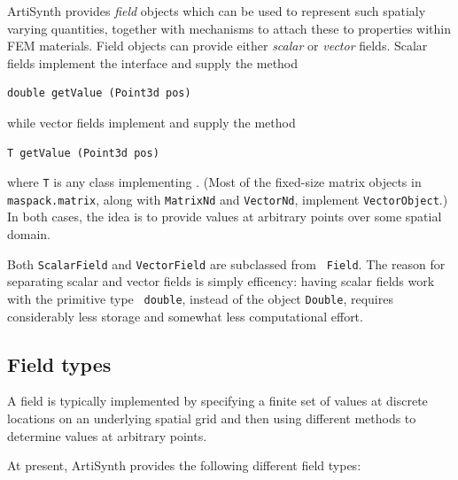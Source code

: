 ArtiSynth provides {\it field} objects which can be used to represent
such spatialy varying quantities, together with mechanisms to attach
these to properties within FEM materials.  Field objects can provide
either {\it scalar} or {\it vector} fields. Scalar fields
implement the interface 
and supply the method
%
\begin{lstlisting}[]
   double getValue (Point3d pos)
\end{lstlisting}
%
while vector fields implement
and supply the method
%
\begin{lstlisting}[]
   T getValue (Point3d pos)
\end{lstlisting}
%
where {\tt T} is any class implementing
. (Most of the fixed-size
matrix objects in {\tt maspack.matrix}, along with {\tt MatrixNd} and
{\tt VectorNd}, implement {\tt VectorObject}.)  In both cases, the
idea is to provide values at arbitrary points over some spatial
domain.

\begin{sideblock}
Both {\tt ScalarField} and {\tt VectorField} are subclassed from {\tt
Field}. The reason for separating scalar and vector fields is simply
efficency: having scalar fields work with the primitive type {\tt
double}, instead of the object {\tt Double}, requires considerably
less storage and somewhat less computational effort.
\end{sideblock}

\subsection{Field types}

A field is typically implemented by specifying a finite set of values
at discrete locations on an underlying spatial grid and then using
different methods to determine values at arbitrary points.

At present, ArtiSynth provides the following different field types:

